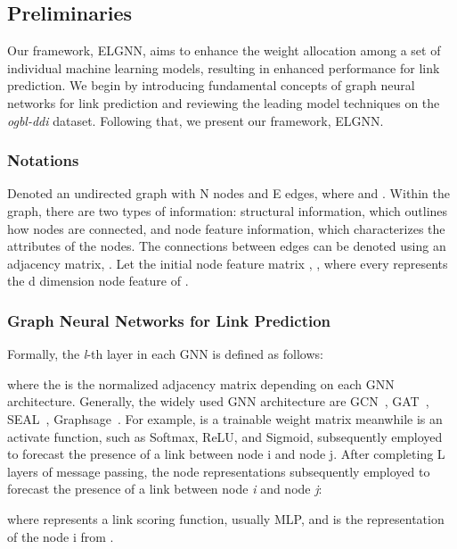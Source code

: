 \documentclass[11pt]{article}
\begin{document}
\subsection{Preliminaries}
Our framework, ELGNN, aims to enhance the weight allocation among a set of individual machine learning models, resulting in enhanced performance for link prediction. We begin by introducing fundamental concepts of graph neural networks for link prediction and reviewing the leading model techniques on the \textit{ogbl-ddi} dataset. Following that, we present our framework, ELGNN. 

\subsubsection{Notations}
Denoted an undirected graph  with N nodes and E edges, where  and . Within the graph, there are two types of information: structural information, which outlines how nodes are connected, and node feature information, which characterizes the attributes of the nodes. The connections between edges can be denoted using an adjacency matrix, . Let the initial node feature matrix , , where every  represents the d dimension node feature of . 

\subsubsection{Graph Neural Networks for Link Prediction}
Formally, the \textit{l}-th layer in each GNN is defined as follows:

where the  is the normalized adjacency matrix depending on each GNN architecture. Generally, the widely used GNN architecture are GCN~\cite{kipf2016semi}, GAT~\cite{velivckovic2017graph}, SEAL~\cite{zhang2020revisiting}, Graphsage~\cite{hamilton2017inductive}. 
For example,  is a trainable weight matrix meanwhile  is an activate function, such as Softmax, ReLU, and Sigmoid,
subsequently employed to forecast the presence of a link between node i and node j. 
After completing L layers of message passing, the node representations  subsequently employed to forecast the presence of a link between node \textit{i} and node \textit{j}:



where  represents a link scoring function, usually MLP, and  is the representation of the node i from . 
\end{document}
